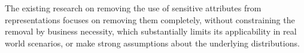 The existing research on removing the use of sensitive attributes from
representations focuses on removing them completely, without constraining the
removal by business necessity, which substantially limits its applicability in
real world scenarios\cite{Beutel2017DataDA}, or make strong assumptions about
the underlying distributions\cite{Kamishima}.

